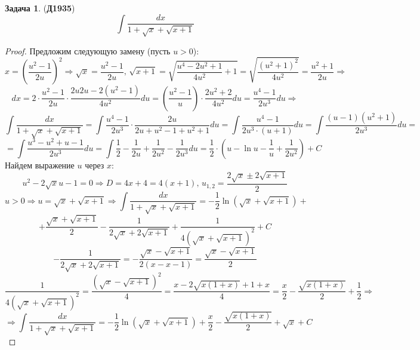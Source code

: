 \documentclass[12pt]{article}
\theoremstyle{definition}
\newtheorem{problem}{Задача}
\DeclareMathOperator{\dint}{\displaystyle\int}
\begin{document}
\newpage
\begin{problem}(\textbf{Д1935})
	$$
		\dint \dfrac{dx}{1 + \sqrt{x} + \sqrt{x+1}}
	$$
\end{problem}
\begin{proof}
	Предложим следующую замену (пусть $u > 0$):
	$$
		x = \left(\dfrac{u^2 - 1}{2u}\right)^2 \Rightarrow \sqrt{x} = \dfrac{u^2 - 1}{2u}, \, \sqrt{x+1} = \sqrt{\dfrac{u^4 - 2u^2 + 1}{4u^2} + 1 } = \sqrt{\dfrac{(u^2 + 1)^2}{4u^2}} = \dfrac{u^2 + 1}{2u} \Rightarrow
	$$
	$$
		dx = 2{\cdot}\dfrac{u^2 -1}{2u}{\cdot}\dfrac{2u2u - 2(u^2 -1)}{4u^2}du= \left(\dfrac{u^2 -1}{u}\right){\cdot}\dfrac{2u^2 +2}{4u^2}du = \dfrac{u^4 -1}{2u^3}du \Rightarrow
	$$
	$$
		\dint \dfrac{dx}{1 + \sqrt{x} + \sqrt{x+1}} = \dint \dfrac{u^4 -1 }{2u^3}{\cdot}\dfrac{2u}{2u + u^2 -1  + u^2 + 1}du = \dint \dfrac{u^4 - 1}{2u^3{\cdot}(u + 1)}du = \dint \dfrac{(u-1)(u^2 +1)}{2u^3}du =
	$$
	$$
		=  \dint\dfrac{u^3 - u^2 + u -1}{2u^3}du = \dint \dfrac{1}{2} - \dfrac{1}{2u} + \dfrac{1}{2u^2} - \dfrac{1}{2u^3}du = \dfrac{1}{2}{\cdot}\left(u - \ln{u} - \dfrac{1}{u} + \dfrac{1}{2u^2}\right) + C
	$$
	Найдем выражение $u$ через $x$:
	$$
		u^2 - 2\sqrt{x}u - 1 = 0 \Rightarrow D = 4x + 4 =4(x+ 1),\, u_{1,2} = \dfrac{2\sqrt{x} \pm 2\sqrt{x + 1}}{2}
	$$
	$$
		u > 0 \Rightarrow u = \sqrt{x} + \sqrt{x+ 1} \Rightarrow \dint \dfrac{dx}{1 + \sqrt{x} + \sqrt{x+1}}  = -\dfrac{1}{2}\ln{( \sqrt{x} + \sqrt{x+ 1})} +
	$$
	$$
		+ \dfrac{ \sqrt{x} + \sqrt{x+ 1}}{2} - \dfrac{1}{2 \sqrt{x} + 2\sqrt{x+ 1}} + \dfrac{1}{4\left( \sqrt{x} + \sqrt{x+ 1}\right)^2} + C
	$$
	$$
		- \dfrac{1}{2 \sqrt{x} + 2\sqrt{x+ 1}}= - \dfrac{\sqrt{x} - \sqrt{x + 1}}{2(x - x - 1)} = \dfrac{\sqrt{x} - \sqrt{x+1}}{2}
	$$
	$$
		\dfrac{1}{4\left( \sqrt{x} + \sqrt{x+ 1}\right)^2}  = \dfrac{(\sqrt{x} - \sqrt{x+1})^2}{4} = \dfrac{x -2\sqrt{x(1 +x)} + 1 + x}{4} = \dfrac{x}{2} - \dfrac{\sqrt{x(1+x)}}{2} + \dfrac{1}{2} \Rightarrow
	$$
	$$
		\Rightarrow \dint \dfrac{dx}{1 + \sqrt{x} + \sqrt{x+1}} = -\dfrac{1}{2}\ln{( \sqrt{x} + \sqrt{x+ 1})}  + \dfrac{x}{2} - \dfrac{\sqrt{x(1+x)}}{2} + \sqrt{x} + C
	$$
\end{proof}
\end{document}
